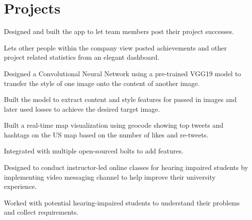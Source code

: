 \documentclass[]{rinkal_resume}
\begin{document}
\begin{minipage}[t]{0.69\textwidth}
\section{Projects}
\begin{tightemize}
\item Designed and built the app to let team members post their project successes.
\item Lets other people within the company view posted achievements and other project related statistics from an elegant dashboard.
\end{tightemize}
\smallsectionsep

\begin{tightemize}
\item Designed a Convolutional Neural Network using a pre-trained VGG19 model to transfer the style of one image onto the content of another image.
\item Built the model to extract content and style features for passed in images and later used losses to achieve the desired target image.
\end{tightemize}
\smallsectionsep

\begin{tightemize}
\item Built a real-time map visualization using geocode showing top tweets and hashtags on the US map based on the number of likes and re-tweets.
\item Integrated with multiple open-sourced bolts to add features.
\end{tightemize}
\smallsectionsep

\begin{tightemize}
\item Designed to conduct instructor-led online classes for hearing impaired students by implementing video messaging channel to help improve their university experience.
\item Worked with potential hearing-impaired students to understand their problems and collect requirements.
\end{tightemize}
\smallsectionsep


\end{minipage}
\end{document}
